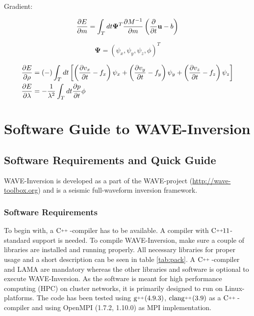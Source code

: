 \documentclass[pdftex,a4paper,parskip,listof=totoc,bibliography=totoc,onehalfspacing,12pt]{scrreprt}
\newcommand{\CC}[1][]{$\text{C\hspace{0ex}}^{_{_{_{++}}}}					%
                      \ifthenelse{\equal{#1}{}}{}{\text{\hspace{-.625ex}#1}}$}
\newcommand{\clang}[1][]{$\text{clang\hspace{0ex}}^{_{_{_{++}}}}		%
                      \ifthenelse{\equal{#1}{}}{}{\text{\hspace{-.25ex}(#1)}}$}
\newcommand{\gCC}[1][]{$\text{g\hspace{0ex}}^{_{_{_{++}}}}				%
                      \ifthenelse{\equal{#1}{}}{}{\text{\hspace{-.25ex}(#1)}}$}
\begin{document}
\begin{center} \Large{Gradient:}\end{center}

\begin{equation}
 \pdv{E}{m}=\int_T dt\mathbf{\Psi}^T \pdv{M^{-1}}{m}\left( \pdv{}{t}\mathbf{u}-b \right)
\end{equation}

\begin{equation}
\mathbf{ \Psi}=\left(\psi_x,\psi_y,\psi_z,\phi\right)^T
\end{equation}

\begin{align}
 \pdv{E}{\rho}&= (-)\int_T dt \left[ \left(\pdv{v_x}{t}-f_x\right)\psi_x +\left(\pdv{v_y}{t}-f_y\right)\psi_y +\left(\pdv{v_z}{t}-f_z\right)\psi_z \right]\\
 \pdv{E}{\lambda}&=- \frac{1}{\lambda^2}\int_T dt  \pdv{p}{t}\phi \\
\end{align}



\part{Software Guide to WAVE-Inversion}
\chapter{Software Requirements and Quick Guide}

WAVE-Inversion is developed as a part of the WAVE-project (\url{http://wave-toolbox.org}) and is a seismic full-waveform inversion framework. 

\section{Software Requirements}

To begin with, a \CC-compiler has to be available. A compiler with  \CC[11]-standard support is needed. To compile WAVE-Inversion, make sure a couple of libraries are installed and running properly. All necessary libraries for proper usage and a short description can be seen in table \ref{tab:pack}. A \CC-compiler and LAMA are mandatory whereas the other libraries and software is optional to execute WAVE-Inversion.
As the software is meant for high performance computing (HPC) on cluster networks, it is primarily designed to run on Linux-platforms. The code has been tested using \gCC[4.9.3], \clang[3.9] as a  \CC-compiler and using OpenMPI (1.7.2, 1.10.0) as MPI implementation.
\end{document}
